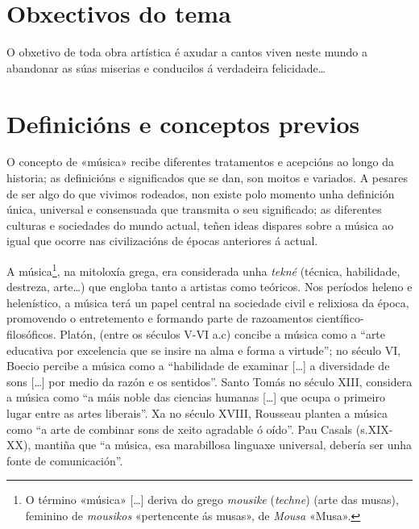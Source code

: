 \documentclass[a4paper, twoside]{templates/ociamthesis}
\begin{document}
\hypertarget{obxectivos-do-tema}{%
\section*{Obxectivos do tema}\label{obxectivos-do-tema}}

\adjustmtc
{}

\begin{savequote}
O obxetivo de toda obra artística é axudar a cantos viven neste mundo a
abandonar as súas miserias e conducilos á verdadeira felicidade\ldots{}
\end{savequote}



\hypertarget{definiciuxf3ns-e-conceptos-previos}{%
\section*{Definicións e conceptos previos}\label{definiciuxf3ns-e-conceptos-previos}}

O concepto de «música» recibe diferentes tratamentos e acepcións ao longo da historia; as definicións e significados que se dan, son moitos e variados. A pesares de ser algo do que vivimos rodeados, non existe polo momento unha definición única, universal e consensuada que transmita o seu significado; as diferentes culturas e sociedades do mundo actual, teñen ideas dispares sobre a música ao igual que ocorre nas civilizacións de épocas anteriores á actual.

A música\footnote{O término «música» {[}\ldots{]} deriva do grego \emph{mousike} (\emph{techne}) (arte das musas), feminino de \emph{mousikos} «pertencente ás musas», de \emph{Mousa} «Musa».}, na mitoloxía grega, era considerada unha \emph{tekné} (técnica, habilidade, destreza, arte\ldots) que engloba tanto a artistas como teóricos. Nos períodos heleno e helenístico, a música terá un papel central na sociedade civil e relixiosa da época, promovendo o entretemento e formando parte de razoamentos científico-filosóficos. Platón, (entre os séculos V-VI a.c) concibe a música como a ``arte educativa por excelencia que se insire na alma e forma a virtude''; no século VI, Boecio percibe a música como a ``habilidade de examinar {[}\ldots{]} a diversidade de sons {[}\ldots{]} por medio da razón e os sentidos''. Santo Tomás no século XIII, considera a música como ``a máis noble das ciencias humanas {[}\ldots{]} que ocupa o primeiro lugar entre as artes liberais''. Xa no século XVIII, Rousseau plantea a música como ``a arte de combinar sons de xeito agradable ó oído''. Pau Casals (s.XIX-XX), mantiña que ``a música, esa marabillosa linguaxe universal, debería ser unha fonte de comunicación''.
\end{document}
